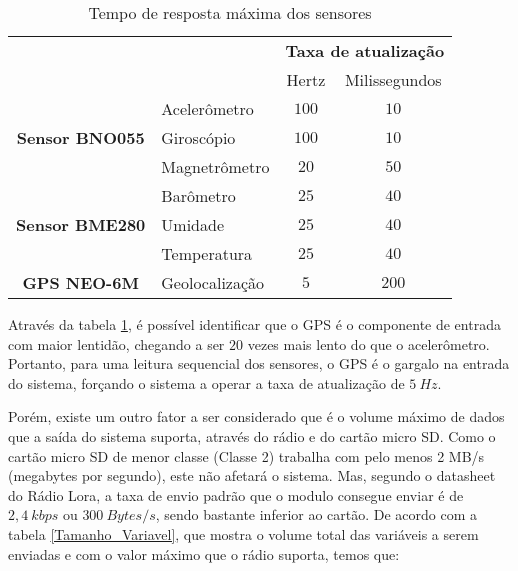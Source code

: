 \begin{table}[!thb]
	\centering
	\caption{\label{tempoderesposta_sensores}Tempo de resposta máxima dos sensores}
	\begin{tabular}{ll|c|c|}
		\cline{3-4}
		\multicolumn{1}{c}{\textbf{}} & 
		\multicolumn{1}{c|}{\textbf{}} & 
		\multicolumn{2}{l|}{\textbf{Taxa de atualização}} 
		\\ \cline{3-4}
		 & \multicolumn{1}{c|}{\textbf{}} & Hertz   & Milissegundos
		\\ \hline
		\multicolumn{1}{|c|}{\multirow{3}{*}{\textbf{Sensor BNO055}}} & Acelerômetro & $100$ & $10$ 
		\\ \cline{2-4}
		\multicolumn{1}{|l|}{} & Giroscópio & $100$ & $10$ 
		\\ \cline{2-4}
	    \multicolumn{1}{|l|}{} & Magnetrômetro & $20$ & $50$ 
		\\ \hline
		\multicolumn{1}{|c|}{\multirow{3}{*}{\textbf{Sensor BME280}}} & Barômetro & $25$ & $40$ 
		\\ \cline{2-4}
		\multicolumn{1}{|l|}{} & Umidade & $25$ & $40$ 
		\\ \cline{2-4}
	    \multicolumn{1}{|l|}{} & Temperatura & $25$ & $40$ 
		\\ \hline
		\multicolumn{1}{|c|}{\textbf{GPS NEO-6M}} & Geolocalização & $5$ & $200$ 
		\\ \hline
	\end{tabular}
	\Ididthis
\end{table}


Através da tabela \ref{tempoderesposta_sensores}, é possível identificar que o GPS é o componente de entrada com maior lentidão, chegando a ser $20$ vezes mais lento do que o acelerômetro. Portanto, para uma leitura sequencial dos sensores, o GPS é o gargalo na entrada do sistema, forçando o sistema a operar a taxa de atualização de $5 \ Hz$.


Porém, existe um outro fator a ser considerado que é o volume máximo de dados que a saída do sistema suporta, através do rádio e do cartão micro SD. Como o cartão micro SD de menor classe (Classe 2) trabalha com pelo menos 2 MB/s (megabytes por segundo), este não afetará o sistema. Mas, segundo o datasheet do Rádio Lora, a taxa de envio padrão que o modulo consegue enviar é de $2,4 \ kbps$ ou $300 \ Bytes/s $, sendo bastante inferior ao cartão. De acordo com a tabela \ref{Tamanho_Variavel}, que mostra o volume total das variáveis a serem enviadas e com o valor máximo que o rádio suporta, temos que:



